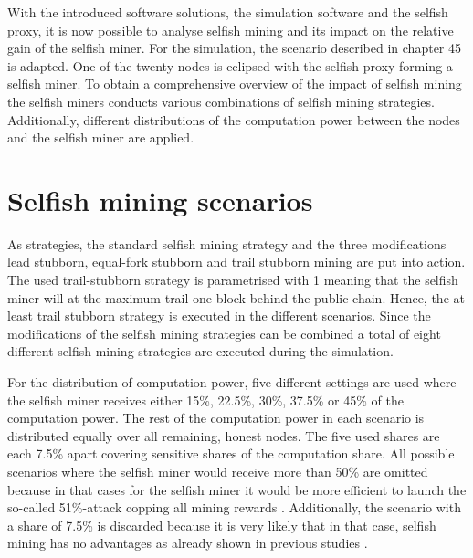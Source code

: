 With the introduced software solutions, the simulation software and the selfish proxy, it is now possible to analyse selfish mining and its impact on the relative gain of the selfish miner.
For the simulation, the scenario described in chapter 45 is adapted.
One of the twenty nodes is eclipsed with the selfish proxy forming a selfish miner.
To obtain a comprehensive overview of the impact of selfish mining the selfish miners conducts various combinations of selfish mining strategies.
Additionally, different distributions of the computation power between the nodes and the selfish miner are applied.

\section{Selfish mining scenarios}

As strategies, the standard selfish mining strategy and the three modifications lead stubborn, equal-fork stubborn and trail stubborn mining are put into action.
The used trail-stubborn strategy is parametrised with 1 meaning that the selfish miner will at the maximum trail one block behind the public chain.
Hence, the at least trail stubborn strategy is executed in the different scenarios.
Since the modifications of the selfish mining strategies can be combined a total of eight different selfish mining strategies are executed during the simulation.

For the distribution of computation power, five different settings are used where the selfish miner receives either 15\%, 22.5\%, 30\%, 37.5\% or 45\% of the computation power.
The rest of the computation power in each scenario is distributed equally over all remaining, honest nodes.
The five used shares are each 7.5\% apart covering sensitive shares of the computation share.
All possible scenarios where the selfish miner would receive more than 50\% are omitted because in that cases for the selfish miner it would be more efficient to launch the so-called 51\%-attack copping all mining rewards \cite{nakamoto2008bitcoin, clarkresearch, tschorsch2016bitcoin}.
Additionally, the scenario with a share of 7.5\% is discarded because it is very likely that in that case, selfish mining has no advantages as already shown in previous studies \cite{eyal2014majority, sapirshtein2016optimal, nayak2016stubborn}.

